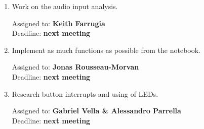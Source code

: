 \documentclass{cce2014-meetings}
\begin{document}
\begin{enumerate}

      \item Work on the audio input analysis.
      \begin{flushright}
            Assigned to: \textbf{Keith Farrugia}\\
            Deadline: \textbf{next meeting}
      \end{flushright}

      \item Implement as much functions as possible from the notebook.
      \begin{flushright}
            Assigned to: \textbf{Jonas Rousseau-Morvan}\\
            Deadline: \textbf{next meeting}
      \end{flushright}

      \item Research button interrupts and using of LEDs.
      \begin{flushright}
            Assigned to: \textbf{Gabriel Vella \& Alessandro Parrella}\\
            Deadline: \textbf{next meeting}
      \end{flushright}


\end{enumerate}
\end{document}
